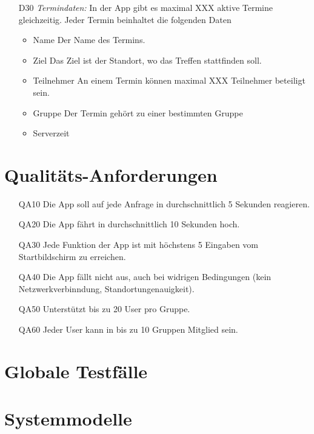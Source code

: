\documentclass{scrartcl}
\begin{document}
\begin{itemize}
		\item [D30] \textit{Termindaten:}
		In der App gibt es maximal XXX aktive Termine gleichzeitig. Jeder Termin beinhaltet die folgenden Daten
		\begin{itemize}
			\item Name
			\newline Der Name des Termins.
			\item Ziel
			\newline Das Ziel ist der Standort, wo das Treffen stattfinden soll.
			\item Teilnehmer
			\newline An einem Termin können maximal XXX Teilnehmer beteiligt sein. 
			\item Gruppe
			\newline Der Termin gehört zu einer bestimmten Gruppe
			\item Serverzeit
			\newline
		\end{itemize}
	\end{itemize}

	\newpage


	\section{Qualitäts-Anforderungen}
	\begin{itemize}[nosep] 
	\item[QA10] Die App soll auf jede Anfrage in durchschnittlich 5 Sekunden reagieren.
	\item[QA20] Die App fährt in durchschnittlich 10 Sekunden hoch.
	\item[QA30] Jede Funktion der App ist mit höchstens 5 Eingaben vom Startbildschirm zu erreichen.
	\item[QA40] Die App fällt nicht aus, auch bei widrigen Bedingungen (kein Netzwerkverbinndung, Standortungenauigkeit).
	\item[QA50] Unterstützt bis zu 20 User pro Gruppe.
	\item[QA60] Jeder User kann in bis zu 10 Gruppen Mitglied sein.
	\end{itemize}

	\newpage


	\section{Globale Testfälle}

	\newpage


	\section{Systemmodelle}
	
\end{document}
